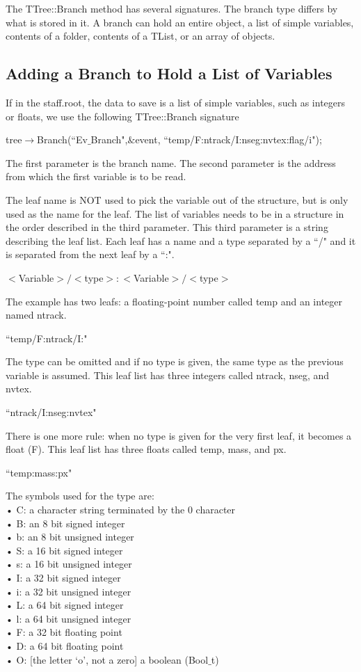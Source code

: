 \documentclass[12pt,a4paper]{article}
\begin{document}
The TTree::Branch method has several signatures. The branch type differs by what is stored in it. A branch can hold an entire object, a list of simple variables, contents of a folder, contents of a TList, or an array of objects. 

\subsection{Adding a Branch to Hold a List of Variables}
If in the staff.root, the data to save is a list of simple variables, such as integers or floats, we use the following TTree::Branch signature

tree$\rightarrow$Branch(``Ev$\_$Branch",$\&$event, ``temp/F:ntrack/I:nseg:nvtex:flag/i");

The first parameter is the branch name. The second parameter is the address from which the first variable is to be read. 

The leaf name is NOT used to pick the variable out of the structure, but is only used as the name for the leaf. The list of variables needs to be in a structure in the order described in the third parameter. This third parameter is a string describing the leaf list. Each leaf has a name and a type separated by a ``/" and it is separated from the next leaf by a ``:".

$<$Variable$>/<$type$>:<$Variable$>/<$type$>$

The example has two leafs: a floating-point number called temp and an integer named ntrack. 

``temp/F:ntrack/I:"

The type can be omitted and if no type is given, the same type as the previous variable is assumed. This leaf list has three integers called ntrack, nseg, and nvtex.

``ntrack/I:nseg:nvtex"

There is one more rule: when no type is given for the very first leaf, it becomes a float (F). This leaf list has three
floats called temp, mass, and px.

``temp:mass:px"

The symbols used for the type are: \\
• C: a character string terminated by the 0 character \\
• B: an 8 bit signed integer \\
• b: an 8 bit unsigned integer \\
• S: a 16 bit signed integer \\
• s: a 16 bit unsigned integer \\
• I: a 32 bit signed integer \\
• i: a 32 bit unsigned integer \\
• L: a 64 bit signed integer \\
• l: a 64 bit unsigned integer \\
• F: a 32 bit floating point \\
• D: a 64 bit floating point \\
• O: [the letter `o', not a zero] a boolean (Bool$\_$t)
\end{document}
